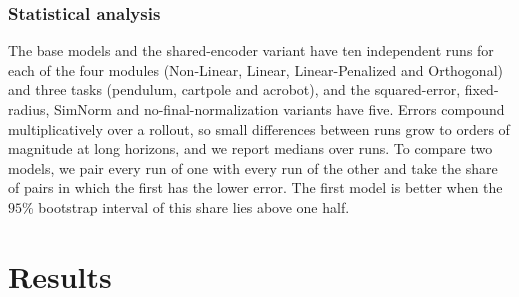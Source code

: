 \subsubsection{Statistical analysis}
\label{sec:stats}
The base models and the shared-encoder variant have ten independent runs for each of the four modules (Non-Linear, Linear, Linear-Penalized and Orthogonal) and three tasks (pendulum, cartpole and acrobot), and the squared-error, fixed-radius, SimNorm and no-final-normalization variants have five. Errors compound multiplicatively over a rollout, so small differences between runs grow to orders of magnitude at long horizons, and we report medians over runs. To compare two models, we pair every run of one with every run of the other and take the share of pairs in which the first has the lower error. The first model is better when the $95$\% bootstrap interval of this share lies above one half.

\section{Results}
\label{sec:exp}
